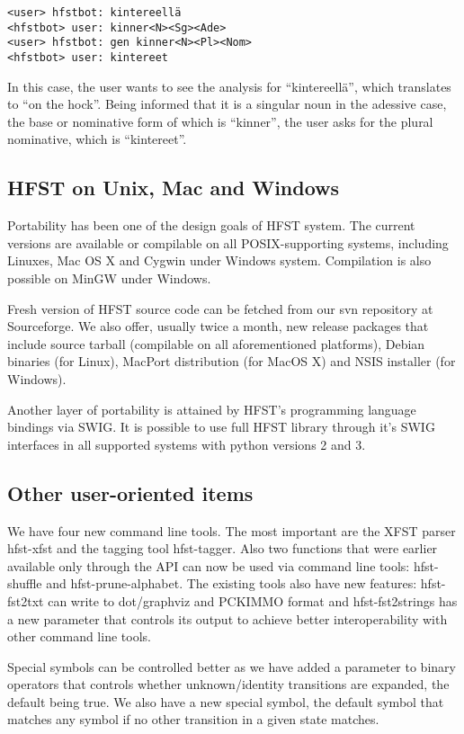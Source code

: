 \documentclass{llncs}
\begin{document}
\begin{verbatim}
<user> hfstbot: kintereellä
<hfstbot> user: kinner<N><Sg><Ade>
<user> hfstbot: gen kinner<N><Pl><Nom>
<hfstbot> user: kintereet
\end{verbatim}

In this case, the user wants to see the analysis for ``kintereellä'',
which translates to ``on the hock''. Being informed that it is
a singular noun in the adessive case, the base or nominative form of which
is ``kinner'', the user asks for the plural nominative, which is ``kintereet''.

\subsection{HFST on Unix, Mac and Windows}

Portability has been one of the design goals of HFST system. The
current versions are available or compilable on all POSIX-supporting
systems, including Linuxes, Mac OS X and Cygwin under Windows
system. Compilation is also possible on MinGW under Windows.

Fresh version of HFST source code can be fetched from our svn
repository at Sourceforge. We also offer, usually twice a month, new
release packages that include source tarball (compilable on all
aforementioned platforms), Debian binaries (for Linux), MacPort
distribution (for MacOS X) and NSIS installer (for Windows).

Another layer of portability is attained by HFST's programming
language bindings via SWIG. It is possible to use full HFST library
through it's SWIG interfaces in all supported systems with python
versions 2 and 3.


\subsection{Other user-oriented items}

We have four new command line tools. The most important are the XFST
parser hfst-xfst and the tagging tool hfst-tagger. Also two functions
that were earlier available only through the API can now be used via
command line tools: hfst-shuffle and hfst-prune-alphabet. The existing
tools also have new features: hfst-fst2txt can write to dot/graphviz
and PCKIMMO format and hfst-fst2strings has a new parameter that
controls its output to achieve better interoperability with other
command line tools.

Special symbols can be controlled better as we have added a parameter
to binary operators that controls whether unknown/identity transitions
are expanded, the default being true. We also have a new special
symbol, the default symbol that matches any symbol if no other
transition in a given state matches.
\end{document}
